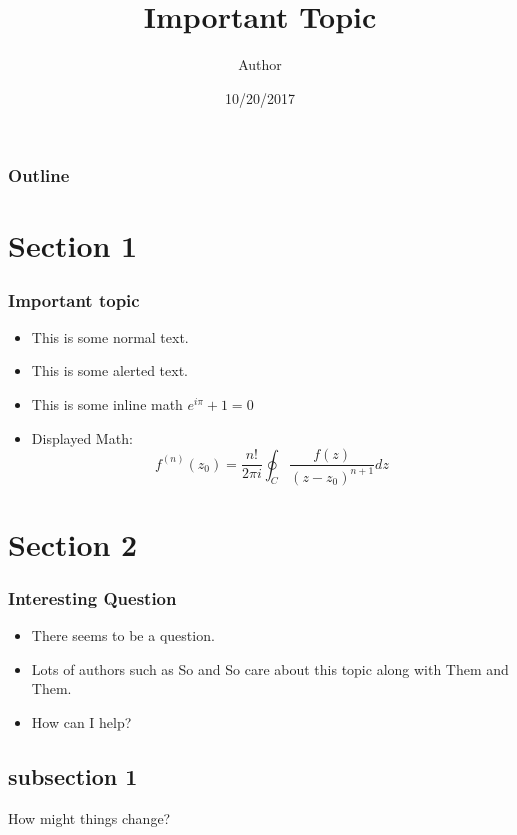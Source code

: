 \documentclass{beamer}
\title{Important Topic}
\author{Author}
\institute[LI]{Ohio State}
\date{10/20/2017}
\begin{document}
	\begin{frame}[plain]
	  \titlepage
	\end{frame}
	\begin{frame}
  		\frametitle{Outline}
		\tableofcontents
	\end{frame}
	
	
\section{Section 1}
	\begin{frame}
			\frametitle{Important topic}
		\begin{itemize}[<+->]
			\item This is some normal text.\\
			\item This is some \alert{alerted text.}\\
			\item This is some inline math $e^{i\pi} + 1 =0$
			\item Displayed Math:
					\begin{equation}
		f^{(n)}(z_0) = \frac{n!}{2\pi i}\oint_C \frac{f(z)}{(z-z_0)^{n+1}} dz
					\end{equation}
						
				 
		\end{itemize}
	\end{frame}


\section{Section 2}
		\begin{frame}
			\frametitle{Interesting Question}
				\begin{itemize}[<+->]
				\item There seems to be a question.\\
				\item Lots of authors such as \alert{So and So} care about this topic along with \alert{Them and Them.}
				\item How can I help?


			\end{itemize}
		\end{frame}

\subsection{subsection 1}
		\begin{frame}
		How might things change?
		\end{frame}
\end{document}
